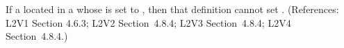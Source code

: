 If a \Species located in a \Compartment whose  is
set to , then that \Species definition cannot set
.  (References: L2V1 Section 4.6.3; L2V2
Section~4.8.4; L2V3 Section~4.8.4; L2V4 Section~4.8.4.)
